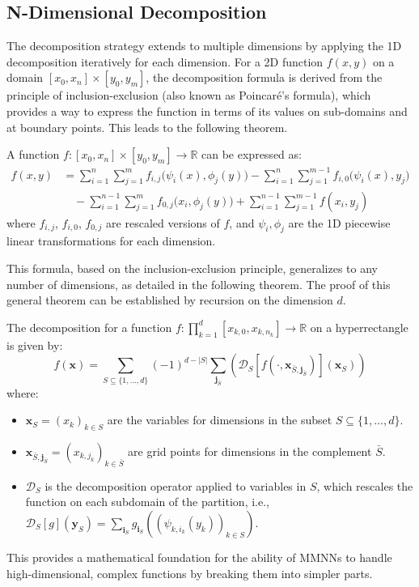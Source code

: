 \documentclass{article}
\begin{document}
\subsection{N-Dimensional Decomposition}
The decomposition strategy extends to multiple dimensions by applying the 1D decomposition iteratively for each dimension. For a 2D function $f(x,y)$ on a domain $[x_0,x_n]\times [y_0,y_m]$, the decomposition formula is derived from the principle of inclusion-exclusion (also known as Poincaré's formula), which provides a way to express the function in terms of its values on sub-domains and at boundary points. This leads to the following theorem.

\begin{theorem}[2D Decomposition]
A function $f:[x_0,x_n]\times [y_0, y_m]\to\mathbb{R}$ can be expressed as:
\begin{equation}
    \begin{split}          
        f( x, y) & = \sum_{i=1}^n \sum_{j=1}^m f_{i,j}\Big( \psi_i(x), \phi_j(y)\Big) - \sum_{i=1}^n\sum_{j=1}^{m-1} f_{i,0}\Big(\psi_i(x), y_{j}\Big) \\
        & \quad - \sum_{i=1}^{n-1} \sum_{j=1}^m f_{0,j}\Big( x_i, \phi_j(y)\Big) + \sum_{i=1}^{n-1}\sum_{j=1}^{m-1} f (x_i, y_{j})
    \end{split}
\end{equation}
where $f_{i,j}$, $f_{i,0}$, $f_{0,j}$ are rescaled versions of $f$, and $\psi_i, \phi_j$ are the 1D piecewise linear transformations for each dimension.
\end{theorem}
This formula, based on the inclusion-exclusion principle, generalizes to any number of dimensions, as detailed in the following theorem. The proof of this general theorem can be established by recursion on the dimension $d$.

\begin{theorem}
The decomposition for a function $f: \prod_{k=1}^d [x_{k,0}, x_{k, n_k}] \to \mathbb{R}$ on a hyperrectangle is given by:
\begin{equation}
    f(\bm{x}) = \sum_{S \subseteq \{1, \dots, d\}} (-1)^{d-|S|} \sum_{\bm{j}_{\bar{S}}} \left( \mathcal{D}_S \left[ f(\cdot, \bm{x}_{\bar{S}, \bm{j}_{\bar{S}}}) \right] (\bm{x}_S) \right)
\end{equation}
where:
\begin{itemize}
    \item $\bm{x}_S = (x_k)_{k \in S}$ are the variables for dimensions in the subset $S \subseteq \{1, \dots, d\}$.
    \item $\bm{x}_{\bar{S}, \bm{j}_{\bar{S}}} = (x_{k, j_k})_{k \in \bar{S}}$ are grid points for dimensions in the complement $\bar{S}$.
    \item $\mathcal{D}_S$ is the decomposition operator applied to variables in $S$, which rescales the function on each subdomain of the partition, i.e., $\mathcal{D}_S[g](\bm{y}_S) = \sum_{\bm{i}_S} g_{\bm{i}_S}((\psi_{k, i_k}(y_k))_{k \in S})$.
\end{itemize}
This provides a mathematical foundation for the ability of MMNNs to handle high-dimensional, complex functions by breaking them into simpler parts.
\end{theorem}
\end{document}
